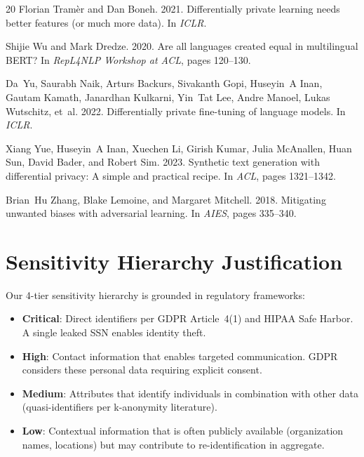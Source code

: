 \documentclass[11pt,a4paper]{article}
\begin{document}
\begin{thebibliography}{20}
Florian Tram\`{e}r and Dan Boneh. 2021.
\newblock Differentially private learning needs better features (or much more
  data).
\newblock In \emph{ICLR}.

Shijie Wu and Mark Dredze. 2020.
\newblock Are all languages created equal in multilingual BERT?
\newblock In \emph{RepL4NLP Workshop at ACL}, pages 120--130.

Da~Yu, Saurabh Naik, Arturs Backurs, Sivakanth Gopi, Huseyin~A Inan,
Gautam Kamath, Janardhan Kulkarni, Yin~Tat Lee, Andre Manoel,
Lukas Wutschitz, et~al. 2022.
\newblock Differentially private fine-tuning of language models.
\newblock In \emph{ICLR}.

Xiang Yue, Huseyin~A Inan, Xuechen Li, Girish Kumar, Julia McAnallen,
Huan Sun, David Bader, and Robert Sim. 2023.
\newblock Synthetic text generation with differential privacy: A simple and
  practical recipe.
\newblock In \emph{ACL}, pages 1321--1342.

Brian~Hu Zhang, Blake Lemoine, and Margaret Mitchell. 2018.
\newblock Mitigating unwanted biases with adversarial learning.
\newblock In \emph{AIES}, pages 335--340.

\end{thebibliography}

\appendix

\section{Sensitivity Hierarchy Justification}
\label{app:sensitivity}

Our 4-tier sensitivity hierarchy is grounded in regulatory frameworks:

\begin{itemize}
    \item \textbf{Critical}: Direct identifiers per GDPR Article~4(1) and
    HIPAA Safe Harbor.  A single leaked SSN enables identity theft.

    \item \textbf{High}: Contact information that enables targeted
    communication.  GDPR considers these personal data requiring explicit
    consent.

    \item \textbf{Medium}: Attributes that identify individuals in combination
    with other data (quasi-identifiers per k-anonymity literature).

    \item \textbf{Low}: Contextual information that is often publicly
    available (organization names, locations) but may contribute to
    re-identification in aggregate.
\end{itemize}
\end{document}
